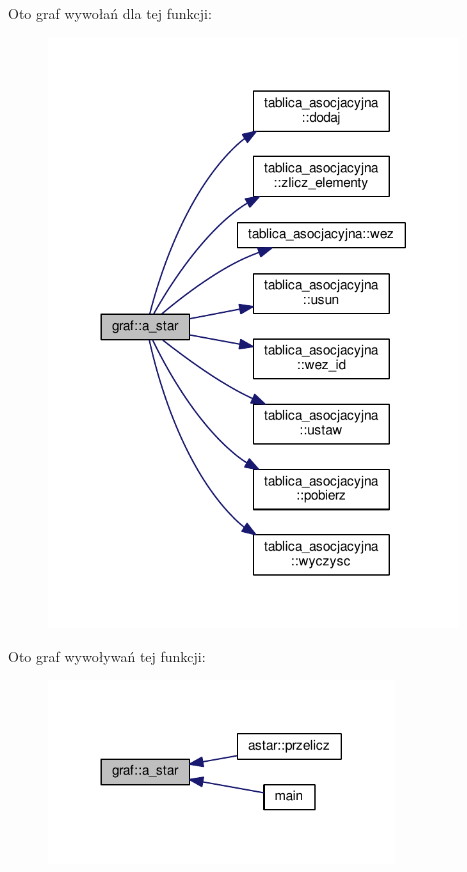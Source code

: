 Oto graf wywołań dla tej funkcji\-:\nopagebreak
\begin{figure}[H]
\begin{center}
\leavevmode
\includegraphics[width=308pt]{classgraf_aa0a5bfb4cb8a7d76620804cbc6230752_cgraph}
\end{center}
\end{figure}




Oto graf wywoływań tej funkcji\-:\nopagebreak
\begin{figure}[H]
\begin{center}
\leavevmode
\includegraphics[width=260pt]{classgraf_aa0a5bfb4cb8a7d76620804cbc6230752_icgraph}
\end{center}
\end{figure}


